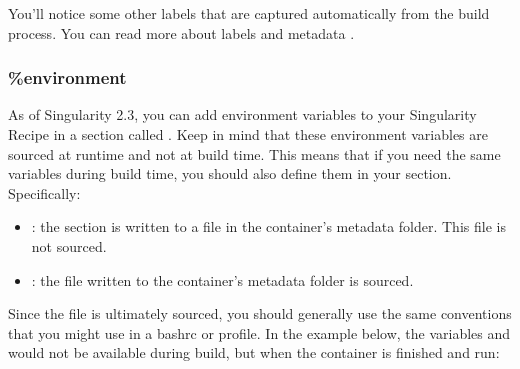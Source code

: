 \documentclass[letterpaper,10pt,english]{sphinxmanual}
\begin{document}
You’ll notice some other labels that are captured automatically from the
build process. You can read more about labels and metadata {\hyperref[\detokenize{environment_and_metadata:environment-and-metadata}]{}}.


\subsubsection{\%environment}
\label{\detokenize{container_recipes:environment}}
\begin{DUlineblock}{0em}
\item[] As of Singularity 2.3, you can add environment variables to your
Singularity Recipe in a section called . Keep in mind that these
environment variables are sourced at runtime and not at build time.
This means that if you need the same variables during build time, you
should also define them in your  section. Specifically:
\end{DUlineblock}
\begin{itemize}
\item {} 
: the  section is written to a file in the container’s
metadata folder. This file is not sourced.

\item {} 
: the file written to the container’s metadata
folder is sourced.

\end{itemize}

Since the file is ultimately sourced, you should generally use the same
conventions that you might use in a bashrc or profile. In the example
below, the variables  and  would not be available during build, but when
the container is finished and run:
\end{document}
